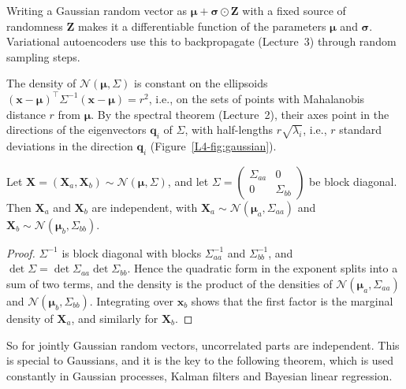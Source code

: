 \begin{remark}
    Writing a Gaussian random vector as $\boldsymbol{\mu} + \boldsymbol{\sigma} \odot \mathbf{Z}$ with a fixed source of randomness $\mathbf{Z}$ makes it a differentiable function of the parameters $\boldsymbol{\mu}$ and $\boldsymbol{\sigma}$. Variational autoencoders use this to backpropagate (Lecture~3) through random sampling steps.
\end{remark}

The density of $\mathcal{N}(\boldsymbol{\mu}, \Sigma)$ is constant on the ellipsoids $(\mathbf{x} - \boldsymbol{\mu})^\top\Sigma^{-1}(\mathbf{x} - \boldsymbol{\mu}) = r^2$, i.e., on the sets of points with Mahalanobis distance $r$ from $\boldsymbol{\mu}$. By the spectral theorem (Lecture~2), their axes point in the directions of the eigenvectors $\mathbf{q}_i$ of $\Sigma$, with half-lengths $r\sqrt{\lambda_i}$, i.e., $r$ standard deviations in the direction $\mathbf{q}_i$ (Figure~\ref{L4-fig:gaussian}).

\begin{theorem}\label{L4-thm:gaussian-blocks}
    Let $\mathbf{X} = (\mathbf{X}_a, \mathbf{X}_b) \sim \mathcal{N}(\boldsymbol{\mu}, \Sigma)$, and let $\Sigma = \left(\begin{smallmatrix} \Sigma_{aa} & 0 \\ 0 & \Sigma_{bb} \end{smallmatrix}\right)$ be block diagonal. Then $\mathbf{X}_a$ and $\mathbf{X}_b$ are independent, with $\mathbf{X}_a \sim \mathcal{N}(\boldsymbol{\mu}_a, \Sigma_{aa})$ and $\mathbf{X}_b \sim \mathcal{N}(\boldsymbol{\mu}_b, \Sigma_{bb})$.
\end{theorem}

\begin{proof}
    $\Sigma^{-1}$ is block diagonal with blocks $\Sigma_{aa}^{-1}$ and $\Sigma_{bb}^{-1}$, and $\det\Sigma = \det\Sigma_{aa}\det\Sigma_{bb}$. Hence the quadratic form in the exponent splits into a sum of two terms, and the density is the product of the densities of $\mathcal{N}(\boldsymbol{\mu}_a, \Sigma_{aa})$ and $\mathcal{N}(\boldsymbol{\mu}_b, \Sigma_{bb})$. Integrating over $\mathbf{x}_b$ shows that the first factor is the marginal density of $\mathbf{X}_a$, and similarly for $\mathbf{X}_b$.
\end{proof}

So for jointly Gaussian random vectors, uncorrelated parts are independent. This is special to Gaussians, and it is the key to the following theorem, which is used constantly in Gaussian processes, Kalman filters and Bayesian linear regression.

